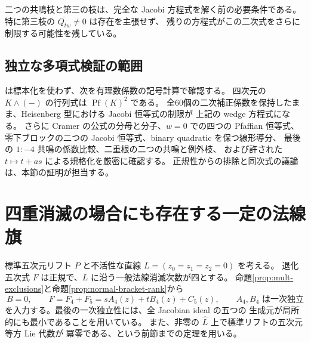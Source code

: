 \documentclass[11pt,a4paper]{ltjsarticle}
\theoremstyle{remark}\newtheorem{remark}[theorem]{注意}
\begin{document}
二つの共鳴枝と第三の枝は、完全な Jacobi 方程式を解く前の必要条件である。
特に第三枝の $\overline{Q_{tw}}\ne0$ は存在を主張せず、
残りの方程式がこの二次式をさらに制限する可能性を残している。

\subsection{独立な多項式検証の範囲}

 は標本化を使わず、次を有理数係数の記号計算で確認する。
四次元の $K\wedge(-)$ の行列式は $\operatorname{Pf}(K)^2$ である。
全60個の二次補正係数を保持したまま、Heisenberg 型における Jacobi 恒等式の制限が
上記の wedge 方程式になる。
さらに Cramer の公式の分母と分子、$w=0$ での四つの Pfaffian 恒等式、
零下ブロックの二つの Jacobi 恒等式、binary quadratic を保つ線形導分、
最後の $1:-4$ 共鳴の係数比較、二重根の二つの共鳴と例外枝、
および許された $t\mapsto t+as$ による規格化を厳密に確認する。
正規性からの排除と同次式の議論は、本節の証明が担当する。


\section{四重消滅の場合にも存在する一定の法線旗}
\label{sec:v18-m4-flag}

標準五次元リフト $P$ と不活性な直線
$L=(z_0=z_1=z_2=0)$ を考える。
退化五次式 $F$ は正規で、$L$ に沿う一般法線消滅次数が四とする。
命題\ref{prop:mult-exclusions}と命題\ref{prop:normal-bracket-rank}から
\[
 B=0,\qquad
 F=F_4+F_5=sA_4(z)+tB_4(z)+C_5(z),
 \qquad A_4,B_4\text{ は一次独立}
\]
を入力する。最後の一次独立性には、全 Jacobian ideal の五つの
生成元が局所的にも最小であることを用いている。
また、非零の $\widehat L$ 上で標準リフトの五次元等方 Lie 代数が
冪零である、という前節までの定理を用いる。
\end{document}
